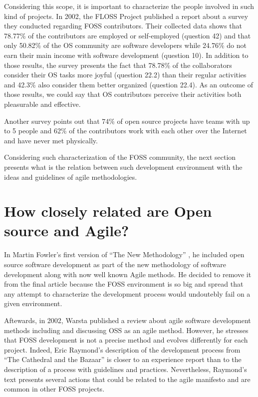 \documentclass[lnbip]{svmultln}
\begin{document}
Considering this scope, it is important to characterize the people
involved in such kind of projects. In 2002, the FLOSS Project
\cite{url:flossproject} published a report about a survey they
conducted regarding FOSS contributors. Their collected data
\cite{url:flossdata} shows that 78.77\% of the contributors are
employed or self-employed (question 42) and that only 50.82\% of the
OS community are software developers while 24.76\% do not earn their
main income with software development (question 10).  In addition to
those results, the survey presents the fact that 78.78\% of the
collaborators consider their OS tasks more joyful (question 22.2) than
their regular activities and 42.3\% also consider them better
organized (question 22.4). As an outcome of those results, we could
say that OS contributors perceive their activities both pleasurable
and effective.


Another survey \cite{reis2003} points out that 74\% of open source
projects have teams with up to 5 people and 62\% of the contributors
work with each other over the Internet and have never met physically.

Considering such characterization of the FOSS community, the next
section presents what is the relation between such development
environment with the ideas and guidelines of agile methodologies.

\section{How closely related are Open source and Agile?}
\label{sec:relation}

In Martin Fowler's first version of ``The New Methodology''
\cite{url:fowler2000orig}, he included open source software
development as part of the new methodology of software development
along with now well known Agile methods. He decided to remove it from
the final article because the FOSS environment is so big and spread
that any attempt to characterize the development process would
undoutebly fail on a given environment.

Aftewards, in 2002, Warsta \cite{warsta2002} published a review about
agile software development methods including and discussing OSS as an
agile method.  However, he stresses that FOSS development is not a
precise method and evolves differently for each project. Indeed, Eric
Raymond's description of the development process from ``The Cathedral
and the Bazaar'' \cite{raymond1999} is closer to an experience report
than to the description of a process with guidelines and
practices. Nevertheless, Raymond's text presents several actions that
could be related to the agile manifesto \cite{url:agilemanifesto} and
are common in other FOSS projects.
\end{document}
